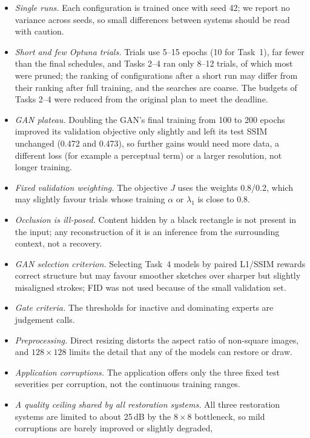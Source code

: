 \documentclass[conference]{IEEEtran}
\begin{document}
\begin{itemize}
  \item \emph{Single runs.} Each configuration is trained once with seed 42;
  we report no variance across seeds, so small differences between systems
  should be read with caution.
  \item \emph{Short and few Optuna trials.} Trials use 5--15 epochs (10 for
  Task~1), far fewer than the final schedules, and Tasks 2--4 ran only 8--12
  trials, of which most were pruned; the ranking of configurations after a
  short run may differ from their ranking after full training, and the
  searches are coarse. The budgets of Tasks 2--4 were reduced from the
  original plan to meet the deadline.
  \item \emph{GAN plateau.} Doubling the GAN's final training from 100 to 200
  epochs improved its validation objective only slightly and left its test
  SSIM unchanged (0.472 and 0.473), so further gains would need more data,
  a different loss (for example a perceptual term) or a larger resolution,
  not longer training.
  \item \emph{Fixed validation weighting.} The objective $J$ uses the
  weights 0.8/0.2, which may slightly favour trials whose training $\alpha$
  or $\lambda_1$ is close to 0.8.
  \item \emph{Occlusion is ill-posed.} Content hidden by a black rectangle is
  not present in the input; any reconstruction of it is an inference from the
  surrounding context, not a recovery.
  \item \emph{GAN selection criterion.} Selecting Task~4 models by paired
  L1/SSIM rewards correct structure but may favour smoother sketches over
  sharper but slightly misaligned strokes; FID was not used because of the
  small validation set.
  \item \emph{Gate criteria.} The thresholds for inactive and dominating
  experts are judgement calls.
  \item \emph{Preprocessing.} Direct resizing distorts the aspect ratio of
  non-square images, and $128\times128$ limits the detail that any of the
  models can restore or draw.
  \item \emph{Application corruptions.} The application offers only the three
  fixed test severities per corruption, not the continuous training ranges.
  \item \emph{A quality ceiling shared by all restoration systems.} All three
  restoration systems are limited to about 25\,dB by the $8\times8$
  bottleneck, so mild corruptions are barely improved or slightly degraded,

\end{itemize}
\end{document}
